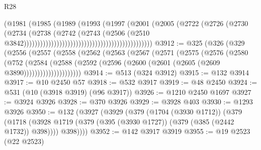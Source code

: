 \begin{lexlean}{R28}
\begin{coremodule}
                                                                  (@1981
                                                                    (@1985
                                                                      (@1989
                                                                        (@1993
                                                                          (@1997
                                                                            (@2001
                                                                              (@2005
                                                                                (@2722
                                                                                  (@2726
                                                                                    (@2730
                                                                                      (@2734
                                                                                        (@2738
                                                                                          (@2742
                                                                                            (@2743
                                                                                              (@2506
                                                                                                (@2510
                                                                                                  @3842)))))))))))))))))))))))))))))))))))))))))))))))
@3912 := @325
    (@326
      (@329
        (@2556
          (@2557
            (@2558
              (@2562
                (@2563
                  (@2567
                    (@2571
                      (@2575
                        (@2576
                          (@2580
                            (@752
                              (@2584
                                (@2588
                                  (@2592
                                    (@2596 (@2600 (@2601 (@2605 (@2609 @3890)))))))))))))))))))))
@3914 := @513 (@324 @3912)
@3915 := @132 @3914
@3917 := @10 @2450 @57
@3918 := @532 @3917
@3919 := @48 @2450
@3924 := @531 (@10 (@3918 @3919) (@96 @3917))
@3926 := @1210 @2450 @1697
@3927 := @3924 @3926
@3928 := @370 @3926
@3929 := @3928 @403
@3930 := @1293 @3926
@3950 := @132
    (@3927
      (@3929
        (@379
          (@1704 (@3930 @1712))
          (@379
            (@1718 (@3928 @1719 (@379 (@395 (@3930 @1727)) (@379 (@385 (@2442 @1732)) @398))))
            @398))))
@3952 := @142 @3917 @3919
@3955 := @19 @2523 (@22 @2523)

\end{coremodule}
\end{lexlean}
